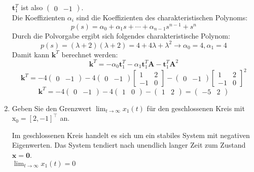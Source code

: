 \documentclass{article}
\begin{document}
\begin{task}
\begin{enumerate}[i]
\begin{solution}
 $\mathbf{t}_{1}^{T}$ ist also $\begin{pmatrix} 0 & -1\end{pmatrix}$.\\ Die Koeffizienten $\alpha_i$ sind die Koeffizienten des charakteristischen Polynoms:
 \[ 
p(s)=\alpha_{0}+\alpha_{1} s+\cdots+\alpha_{n-1} s^{n-1}+s^{n}
 \]
 Durch die Polvorgabe ergibt sich folgendes charakteristische Polynom:
  \[ 
p(s)=(\lambda+2)(\lambda+2)= 4+4\lambda+\lambda^2 \rightarrow \alpha_0 = 4, \alpha_1 = 4
 \]
 Damit kann $\mathbf{k}^{T}$ berechnet werden:
 \[ 
\mathbf{k}^{T}=-\alpha_{0} \mathbf{t}_{1}^{T}-\alpha_{1} \mathbf{t}_{1}^{T} \mathbf{A}-\mathbf{t}_{1}^{T} \mathbf{A}^{2}
 \]
 \[
 \mathbf{k}^{T}=-4 \begin{pmatrix} 0 & -1\end{pmatrix}-4 \begin{pmatrix} 0 & -1\end{pmatrix} \left[\begin{array}{cc}{1} & {2} \\ {-1} & {0}\end{array}\right]-\begin{pmatrix} 0 & -1\end{pmatrix} \left[\begin{array}{cc}{1} & {2} \\ {-1} & {0}\end{array}\right]^{2}
 \]
  \[
 \mathbf{k}^{T}=-4 \begin{pmatrix} 0 & -1\end{pmatrix}-4 \begin{pmatrix} 1 & 0\end{pmatrix} -\begin{pmatrix} 1 & 2\end{pmatrix} = \begin{pmatrix} -5 & 2\end{pmatrix}
 \]
\end{solution}
  \item Geben Sie den Grenzwert $\lim _{t \rightarrow \infty} x_{1}(t)$ für den geschlossenen Kreis mit
$\mathrm{x}_{0}=[2,-1]^{\top}$ an.
\begin{solution}
Im geschlossenen Kreis handelt es sich um ein stabiles System mit negativen Eigenwerten. Das System tendiert nach unendlich langer Zeit zum Zustand $\mathbf{x} = \mathbf{0}$.\\
$\lim _{t \rightarrow \infty} x_{1}(t) = 0$
\end{solution}
\end{enumerate}
\end{task}
\end{document}
